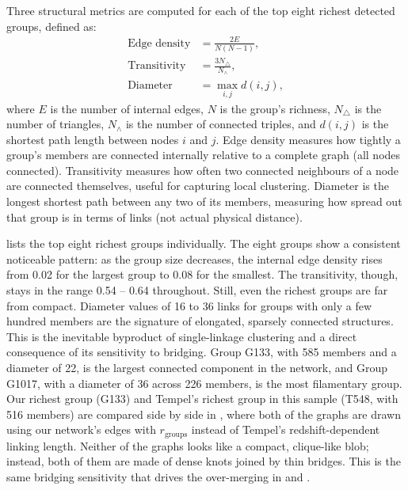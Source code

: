 \documentclass[9pt,a4paper,twocolumn,twoside]{rho-class/rho}
\begin{document}
Three structural metrics are computed for each of the top eight richest detected groups,
defined as:
\begin{align}\label{eq:metrics}
    \text{Edge density} &= \frac{2E}{N(N-1)}, \\
    \text{Transitivity} &= \frac{3 N_\triangle}{N_\wedge}, \\
    \text{Diameter} &= \max_{i,j} d(i,j),
\end{align}
where $E$ is the number of internal edges, $N$ is the group's richness, $N_\triangle$ is
the number of triangles, $N_\wedge$ is the number of connected triples, and $d(i,j)$ is the
shortest path length between nodes $i$ and $j$.
Edge density measures how tightly a group's members are connected internally relative to a complete
graph (all nodes connected). Transitivity measures how often two connected neighbours of a node are
connected themselves, useful for capturing local
clustering. Diameter is the longest shortest path between any two of its members, measuring how spread
out that group is in terms of links (not actual physical distance).

 lists the top eight richest groups individually.
The eight groups show a consistent noticeable pattern: as the group size decreases,
the internal edge density rises from 0.02 for the largest group to 0.08 for the
smallest. The transitivity, though, stays in the range 0.54 -- 0.64
throughout. Still, even the richest groups are far from compact. Diameter values of 16
to 36 links for groups with only a few hundred members are the signature of elongated, sparsely
connected structures. This is the inevitable byproduct of single-linkage clustering and a
direct consequence of its sensitivity to bridging. Group G133,
with 585 members and a diameter of 22, is the largest connected component
in the network, and Group G1017, with a diameter of 36 across 226 members, is the most
filamentary group. Our richest group (G133) and
Tempel's richest group in this sample (T548, with 516 members) are compared side by side in
, where both of the graphs are drawn using our network's edges with $r_{\mathrm{groups}}$
instead of Tempel's redshift-dependent linking length. Neither of the graphs looks like a
compact, clique-like blob; instead, both of them are made of dense knots joined by thin
bridges. This is the same bridging sensitivity that drives the over-merging in 
and .
\end{document}
